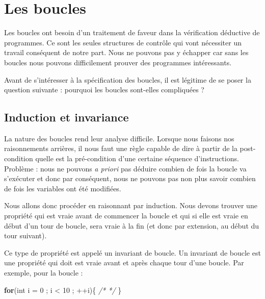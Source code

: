 \documentclass[12pt,francais,]{scrbook}
\newenvironment{Shaded}{}{}
\newcommand{\KeywordTok}[1]{\textcolor[rgb]{0.00,0.44,0.13}{\textbf{{#1}}}}
\newcommand{\DataTypeTok}[1]{\textcolor[rgb]{0.56,0.13,0.00}{{#1}}}
\newcommand{\DecValTok}[1]{\textcolor[rgb]{0.25,0.63,0.44}{{#1}}}
\newcommand{\CommentTok}[1]{\textcolor[rgb]{0.38,0.63,0.69}{\textit{{#1}}}}
\newcommand{\NormalTok}[1]{{#1}}
\begin{document}
\section{Les boucles}\label{les-boucles}

Les boucles ont besoin d'un traitement de faveur dans la vérification
déductive de programmes. Ce sont les seules structures de contrôle qui
vont nécessiter un travail conséquent de notre part. Nous ne pouvons pas
y échapper car sans les boucles nous pouvons difficilement prouver des
programmes intéressants.

Avant de s'intéresser à la spécification des boucles, il est légitime de
se poser la question suivante : pourquoi les boucles sont-elles
compliquées ?

\subsection{Induction et invariance}\label{induction-et-invariance}

La nature des boucles rend leur analyse difficile. Lorsque nous faisons
nos raisonnements arrières, il nous faut une règle capable de dire à
partir de la post-condition quelle est la pré-condition d'une certaine
séquence d'instructions. Problème : nous ne pouvons \emph{a priori} pas
déduire combien de fois la boucle va s'exécuter et donc par conséquent,
nous ne pouvons pas non plus savoir combien de fois les variables ont
été modifiées.

Nous allons donc procéder en raisonnant par induction. Nous devons
trouver une propriété qui est vraie avant de commencer la boucle et qui
si elle est vraie en début d'un tour de boucle, sera vraie à la fin (et
donc par extension, au début du tour suivant).

Ce type de propriété est appelé un invariant de boucle. Un invariant de
boucle est une propriété qui doit est vraie avant et après chaque tour
d'une boucle. Par exemple, pour la boucle :

\begin{footnotesize}\begin{Shaded}
\begin{Highlighting}[]
\KeywordTok{for}\NormalTok{(}\DataTypeTok{int} \NormalTok{i = }\DecValTok{0} \NormalTok{; i < }\DecValTok{10} \NormalTok{; ++i)\{ }\CommentTok{/* */} \NormalTok{\}}
\end{Highlighting}
\end{Shaded}\end{footnotesize}
\end{document}

